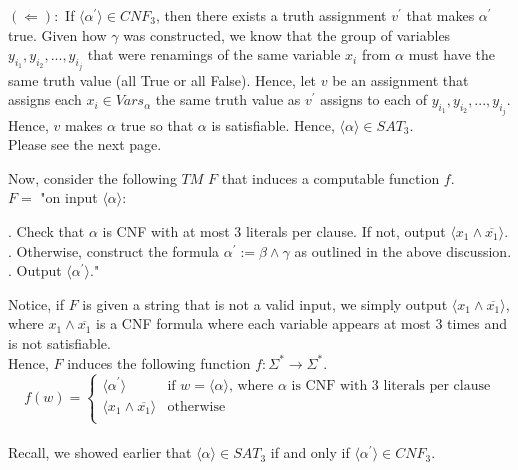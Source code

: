 \documentclass[12pt]{article}
\begin{document}
$(\Leftarrow):$ If $\langle \alpha^\prime \rangle \in CNF_3$, then there exists a truth assignment $v^\prime$ that makes $\alpha^\prime$ true. Given how $\gamma$ was constructed, we know that the group of variables $y_{i_{1}},y_{i_2},...,y_{i_j}$ that were renamings of the same variable $x_i$ from $\alpha$ must have the same truth value (all True or all False). Hence, let $v$ be an assignment that assigns each $x_i \in Vars_{\alpha}$ the same truth value as $v^\prime$ assigns to each of $y_{i_{1}},y_{i_2},...,y_{i_j}$. Hence, $v$ makes $\alpha$ true so that $\alpha$ is satisfiable. Hence, $\langle \alpha \rangle \in SAT_3$. \\

Please see the next page. 

\newpage

Now, consider the following $TM$ $F$ that induces a computable function $f$. \\

$F = $ "on input $\langle \alpha \rangle$: \\

\setlength\parindent{15pt}

. Check that $\alpha$ is CNF with at most 3 literals per clause. If not, output $\langle x_1 \land \overline{x_1} \rangle$. \\

. Otherwise, construct the formula $\alpha^\prime := \beta \land \gamma$ as outlined in the above discussion. \\

. Output $\langle \alpha^\prime \rangle$." \\
\setlength\parindent{0pt}

Notice, if $F$ is given a string that is not a valid input, we simply output $\langle x_1 \land \overline{x_1} \rangle$, where $x_1 \land \overline{x_1}$ is a CNF formula where each variable appears at most 3 times and is not satisfiable. \\

Hence, $F$ induces the following function $f: \Sigma^* \rightarrow \Sigma^*$. \\
\[
  f(w) =
  \begin{cases}
        \langle \alpha^\prime\rangle & \text{if $w = \langle \alpha \rangle$, where $\alpha$ is CNF with 3 literals per clause} \\
        \langle x_1 \land \overline{x_1} \rangle & \text{otherwise} \\
  \end{cases}
\] 
\\
Recall, we showed earlier that $\langle \alpha \rangle \in SAT_3$ if and only if $\langle \alpha^\prime \rangle \in CNF_3$. \\
\end{document}
